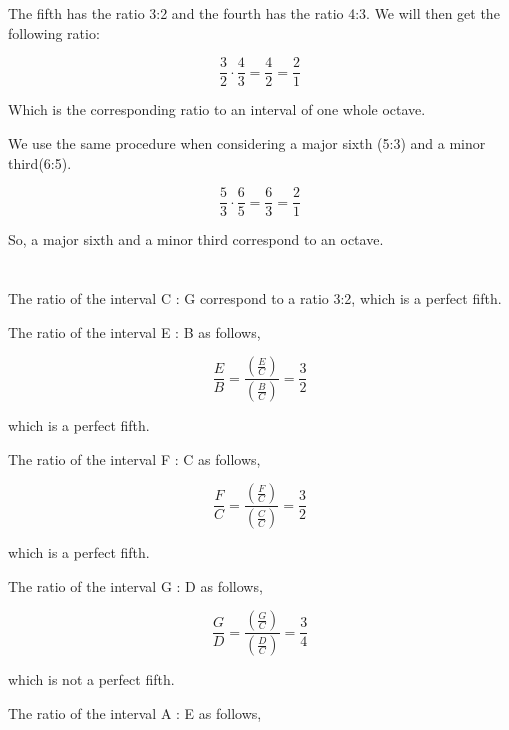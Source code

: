 \documentclass{article}
\begin{document}
\section{}

The fifth has the ratio 3:2 and the fourth has the ratio 4:3. We will then get the following ratio:

\begin{equation}
    \frac{3}{2} \cdot \frac{4}{3} = \frac{4}{2} = \frac{2}{1}
\end{equation}

Which is the corresponding ratio to an interval of one whole octave.

We use the same procedure when considering a major sixth (5:3) and a minor third(6:5).

\begin{equation}
    \frac{5}{3}\cdot \frac{6}{5} = \frac{6}{3} = \frac{2}{1}
\end{equation}

So, a major sixth and a minor third correspond to an octave.


\section{}

The ratio of the interval C : G correspond to a ratio 3:2, which is a perfect fifth.

The ratio of the interval E : B as follows,

\begin{equation}
    \frac{E}{B}=\frac{(\frac{E}{C})}{(\frac{B}{C})} = \frac{3}{2}
\end{equation}

which is a perfect fifth.

The ratio of the interval F : C as follows,

\begin{equation}
    \frac{F}{C}=\frac{(\frac{F}{C})}{(\frac{C}{C})} = \frac{3}{2}
\end{equation}

which is a perfect fifth.

The ratio of the interval G : D as follows,

\begin{equation}
    \frac{G}{D}=\frac{(\frac{G}{C})}{(\frac{D}{C})} = \frac{3}{4}
\end{equation}

which is not a perfect fifth.

The ratio of the interval A : E as follows,
\end{document}
